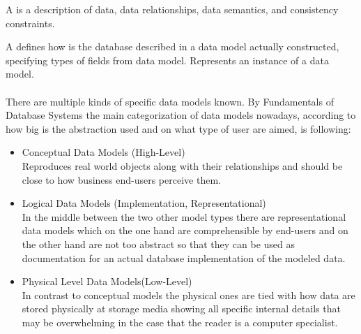 \par
A  is a description of data, data relationships, data semantics, and consistency constraints. \label{DataModel} \\
\par 
A  defines how is the database described in a data model actually constructed, specifying types of fields from data model. Represents an instance of a data model. \\
\\
There are multiple kinds of specific data models known.
By Fundamentals of Database Systems \cite{SilberschatzKorthSudarshan10} the main categorization of data models nowadays, according to how big is the abstraction used and on what type of user are aimed, is following: \label{DataModelsByAbstraction}
\begin{itemize}
	\item Conceptual Data Models (High-Level) \\
		Reproduces real world objects along with their relationships and should be close to how business end-users perceive them.
	
	\item Logical Data Models (Implementation, Representational) \\
		In the middle between the two other model types there are representational data models which on the one hand are comprehensible by end-users and on the other hand are not too abstract so that they can be used as documentation for an actual database implementation of the modeled data.
	
	\item Physical Level Data Models(Low-Level) \\
		 In contrast to conceptual models the physical ones are tied with how data are stored physically at storage media showing all specific internal details that may be overwhelming in the case that the reader is a computer specialist.
\end{itemize}

